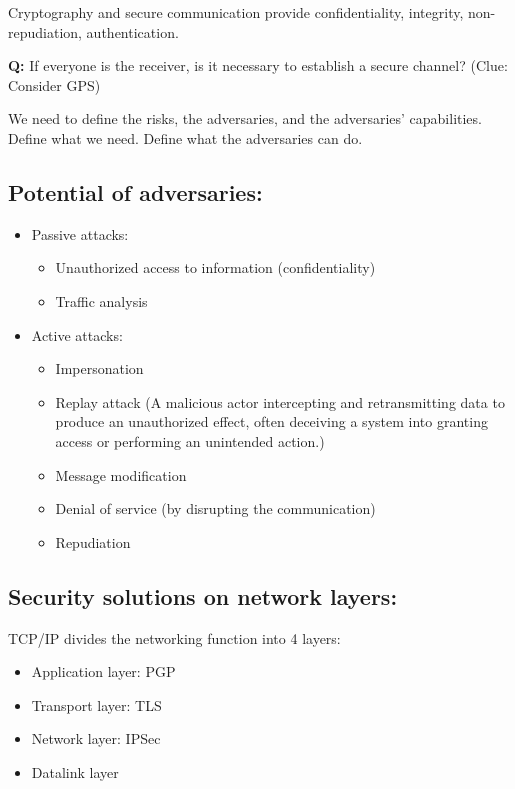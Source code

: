 \documentclass[12pt]{article}
\begin{document}
Cryptography and secure communication provide confidentiality, integrity, non-repudiation, authentication.

\textbf{Q:} If everyone is the receiver, is it necessary to establish a secure channel? (Clue: Consider GPS)

We need to define the risks, the adversaries, and the adversaries' capabilities. Define what we need. Define what the adversaries can do.

\subsection*{Potential of adversaries:}
\begin{itemize}
    \item Passive attacks:
    \begin{itemize}
        \item Unauthorized access to information (confidentiality)
        \item Traffic analysis
    \end{itemize}
    \item Active attacks:
    \begin{itemize}
        \item Impersonation
        \item Replay attack (A malicious actor intercepting and retransmitting data to produce an unauthorized effect, often deceiving a system into granting access or performing an unintended action.)
        \item Message modification
        \item Denial of service (by disrupting the communication)
        \item Repudiation
    \end{itemize}
\end{itemize}

\subsection*{Security solutions on network layers:}
TCP/IP divides the networking function into 4 layers:
\begin{itemize}
    \item Application layer: PGP
    \item Transport layer: TLS
    \item Network layer: IPSec
    \item Datalink layer
\end{itemize}
\end{document}
